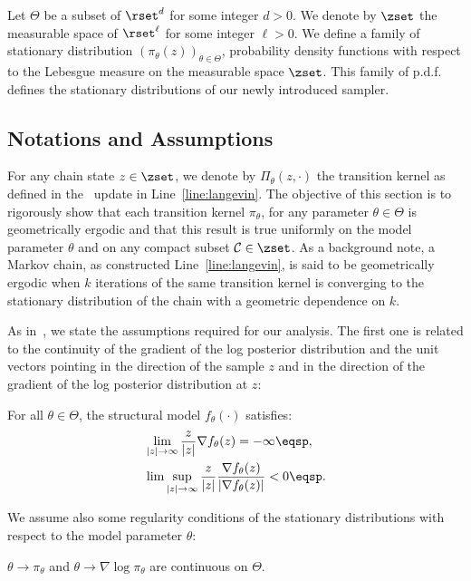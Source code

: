 \documentclass[letterpaper]{article} %
\begin{document}
Let $\Theta$ be a subset of $\rset^d$ for some integer $d >0$.
We denote by $\zset$ the measurable space of $\rset^\ell$ for some integer $\ell >0$.
We define a family of stationary distribution $\left(\pi_\theta(z) \right)_{\theta \in \Theta}$, probability density functions with respect to the Lebesgue measure on the measurable space $\zset$. This family of p.d.f. defines the stationary distributions of our newly introduced sampler.

\subsection{Notations and Assumptions}
For any chain state $z \in \zset$, we denote by $\Pi_\theta(z,\cdot)$ the transition kernel as defined in the \algo\ update in Line~\ref{line:langevin}.
The objective of this section is to rigorously show that each transition kernel $\pi_\theta$, for any parameter $\theta \in \Theta$ is geometrically ergodic and that this result is true uniformly on the model parameter $\theta$ and on any compact subset $\mathcal{C} \in \zset$.
As a background note, a Markov chain, as constructed Line~\ref{line:langevin}, is said to be geometrically ergodic when $k$ iterations of the same transition kernel is converging to the stationary distribution of the chain with a geometric dependence on $k$.

As in~\citet{allassonniere2015convergent}, we state the assumptions required for our analysis.
The first one is related to the continuity of the gradient of the log posterior distribution and the unit vectors pointing in the direction of the sample $z$ and in the direction of the gradient of the log posterior distribution at $z$:
\begin{assumption}\label{ass:bounded}
For all $\theta \in \Theta$, the structural model $f_\theta(\cdot)$ satisfies:
\begin{equation}\notag
\begin{split}
&\lim \limits_{|z| \to \infty} \frac{z}{|z|} \nabla f_{\theta}(z)  = - \infty \eqsp,\\
 &\lim \sup \limits_{|z| \to \infty} \frac{z}{|z|} \frac{\nabla f_{\theta}(z) }{|\nabla f_{\theta}(z) |} < 0 \eqsp.
\end{split}
\end{equation}
\end{assumption}

We assume also some regularity conditions of the stationary distributions with respect to the model parameter $\theta$:
\begin{assumption}\label{ass:contlogpi}
$\theta \to \pi_\theta$ and $\theta \to \nabla \log \pi_\theta$ are continuous on $\Theta$.
\end{assumption}
\end{document}
